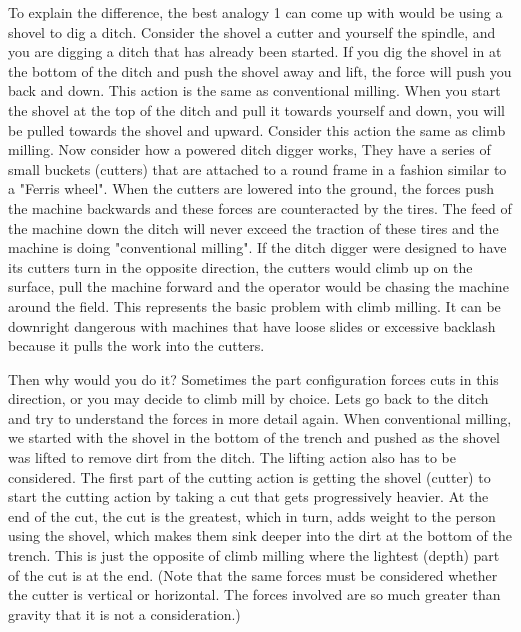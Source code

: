 To explain the difference, the best analogy 1 can come up with would be using a
shovel to dig a ditch. Consider the shovel a cutter and yourself the spindle,
and you are digging a ditch that has already been started. If you dig the shovel
in at the bottom of the ditch and push the shovel away and lift, the force will
push you back and down. This action is the same as conventional milling. When
you start the shovel at the top of the ditch and pull it towards yourself and
down, you will be pulled towards the shovel and upward. Consider this action the
same as climb milling. Now consider how a powered ditch digger works, They have
a series of small buckets (cutters) that are attached to a round frame in a
fashion similar to a "Ferris wheel". When the cutters are lowered into the
ground, the forces push the machine backwards and these forces are counteracted
by the tires. The feed of the machine down the ditch will never exceed the
traction of these tires and the machine is doing "conventional milling". If the
ditch digger were designed to have its cutters turn in the opposite direction,
the cutters would climb up on the surface, pull the machine forward and the
operator would be chasing the machine around the field. This represents the
basic problem with climb milling. It can be downright dangerous with machines
that have loose slides or excessive backlash because it pulls the work into the
cutters.

Then why would you do it? Sometimes the part configuration forces cuts in this
direction, or you may decide to climb mill by choice. Lets go back to the ditch
and try to understand the forces in more detail again. When conventional
milling, we started with the shovel in the bottom of the trench and pushed as
the shovel was lifted to remove dirt from the ditch. The lifting action also has
to be considered. The first part of the cutting action is getting the shovel
(cutter) to start the cutting action by taking a cut that gets progressively
heavier. At the end of the cut, the cut is the greatest, which in turn, adds
weight to the person using the shovel, which makes them sink deeper into the
dirt at the bottom of the trench. This is just the opposite of climb milling
where the lightest (depth) part of the cut is at the end. (Note that the same
forces must be considered whether the cutter is vertical or horizontal. The
forces involved are so much greater than gravity that it is not a
consideration.)


